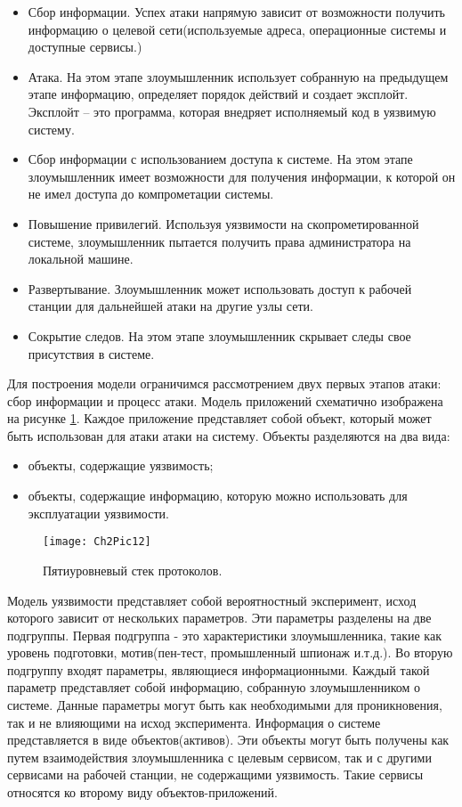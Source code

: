     \begin{itemize}
        \item Сбор информации. Успех атаки напрямую зависит от возможности получить информацию о целевой сети(используемые адреса, операционные системы и доступные сервисы.)
        \item Атака. На этом этапе злоумышленник использует собранную на предыдущем этапе информацию, определяет порядок действий и создает эксплойт. Эксплойт -- это программа, которая внедряет исполняемый код в уязвимую систему.
        \item Сбор информации с использованием доступа к системе. На этом этапе злоумышленник имеет возможности для получения информации, к которой он не имел доступа до компрометации системы.
        \item Повышение привилегий. Используя уязвимости на скопрометированной системе, злоумышленник пытается получить права администратора на локальной машине.
        \item Развертывание. Злоумышленник может использовать доступ к рабочей станции для дальнейшей атаки на другие узлы сети.
        \item Сокрытие следов. На этом этапе злоумышленник скрывает следы свое присутствия в системе.
    \end{itemize}

    Для построения модели ограничимся рассмотрением двух первых этапов атаки: сбор информации и процесс атаки. Модель приложений схематично изображена на рисунке \ref{Pic12}. Каждое приложение представляет собой объект, который может быть использован для атаки атаки на систему. Объекты разделяются на два вида:

    \begin{itemize}
        \item объекты, содержащие уязвимость;
        \item объекты, содержащие информацию, которую можно использовать для эксплуатации уязвимости.
    \end{itemize}


    \begin{figure}\center
        \texttt{[image: Ch2Pic12]}
        \caption{Пятиуровневый стек протоколов.} \label{Pic12}
    \end{figure}

    Модель уязвимости представляет собой вероятностный эксперимент, исход которого зависит от нескольких параметров. Эти параметры разделены на две подгруппы. Первая подгруппа - это характеристики злоумышленника, такие как уровень подготовки, мотив(пен-тест, промышленный шпионаж и.т.д.). Во вторую подгруппу входят параметры, являющиеся информационными. Каждый такой параметр представляет собой информацию, собранную злоумышленником о системе. Данные параметры могут быть как необходимыми для проникновения, так и не влияющими на исход эксперимента. Информация о системе представляется в виде объектов(активов). Эти объекты могут быть получены как путем взаимодействия злоумышленника с целевым сервисом, так и с другими сервисами на рабочей станции, не содержащими уязвимость. Такие сервисы относятся ко второму виду объектов-приложений.

